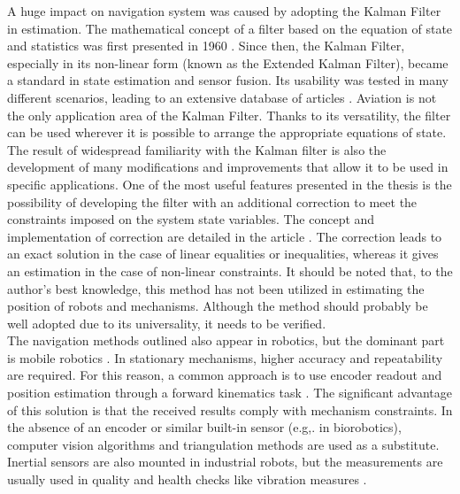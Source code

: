 A huge impact on navigation system was caused by adopting the Kalman Filter in estimation. The mathematical concept of a filter based on the equation of state and statistics was first presented in 1960 \cite{kalman}. Since then, the Kalman Filter, especially in its non-linear form (known as the Extended Kalman Filter), became a standard in state estimation and sensor fusion. Its usability was tested in many different scenarios, leading to an extensive database of articles \cite{ekf_poor} \cite{s16020264} \cite{s120709566}. Aviation is not the only application area of the Kalman Filter. Thanks to its versatility, the filter can be used wherever it is possible to arrange the appropriate equations of state.\\

The result of widespread familiarity with the Kalman filter is also the development of many modifications and improvements that allow it to be used in specific applications. One of the most useful features presented in the thesis is the possibility of developing the filter with an additional correction to meet the constraints imposed on the system state variables. The concept and implementation of correction are detailed in the article \cite{simon}. The correction leads to an exact solution in the case of linear equalities or inequalities, whereas it gives an estimation in the case of non-linear constraints. It should be noted that, to the author's best knowledge, this method has not been utilized in estimating the position of robots and mechanisms. Although the method should probably be well adopted due to its universality, it needs to be verified.\\

The navigation methods outlined also appear in robotics, but the dominant part is mobile robotics \cite{accelerometer_mobile}. In stationary mechanisms, higher accuracy and repeatability are required. For this reason, a common approach is to use encoder readout and position estimation through a forward kinematics task \cite{forward_kinematics}. The significant advantage of this solution is that the received results comply with mechanism constraints. In the absence of an encoder or similar built-in sensor (e.g,. in biorobotics), computer vision algorithms \cite{cv_positioning} \cite{cv_positioning2} and triangulation methods \cite{igps} are used as a substitute. Inertial sensors are also mounted in industrial robots, but the measurements are usually used in quality and health checks like vibration measures \cite{Dogrusoz_2020}.\\

